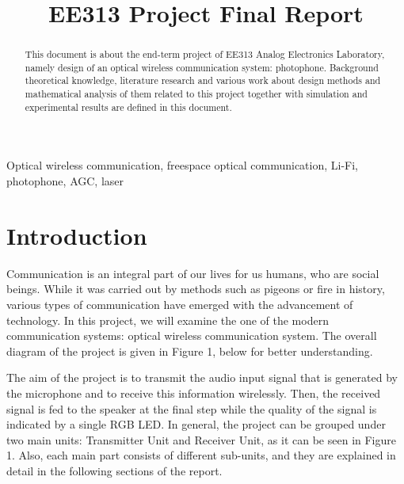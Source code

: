 \documentclass[conference]{IEEEtran}
\begin{document}
\title{EE313 Project Final Report}

\author{
\and
{}
\and
}

\maketitle

\begin{abstract}
This document is about the end-term project of EE313 Analog Electronics Laboratory, namely design of an optical wireless communication system: photophone. Background theoretical knowledge, literature research and various work about design methods and mathematical analysis of them related to this project together with simulation and experimental results are defined in this document. \\
\end{abstract}

\begin{IEEEkeywords}
Optical wireless communication, freespace optical communication, Li-Fi, photophone, AGC, laser
\end{IEEEkeywords} 

\section{Introduction}
Communication is an integral part of our lives for us humans, who are social beings. While it was carried out by methods such as pigeons or fire in history, various types of communication have emerged with the advancement of technology. In this project, we will examine the one of the modern communication systems: optical wireless communication system. The overall diagram of the project is given in Figure 1, below for better understanding.\\ \par
The aim of the project is to transmit the audio input signal that is generated by the microphone and to receive this information wirelessly. Then, the received signal is fed to the speaker at the final step while the quality of the signal is indicated by a single RGB LED. In general, the project can be grouped under two main units: Transmitter Unit and Receiver Unit, as it can be seen in Figure 1. Also, each main part consists of different sub-units, and they are explained in detail in the following sections of the report.
\end{document}
